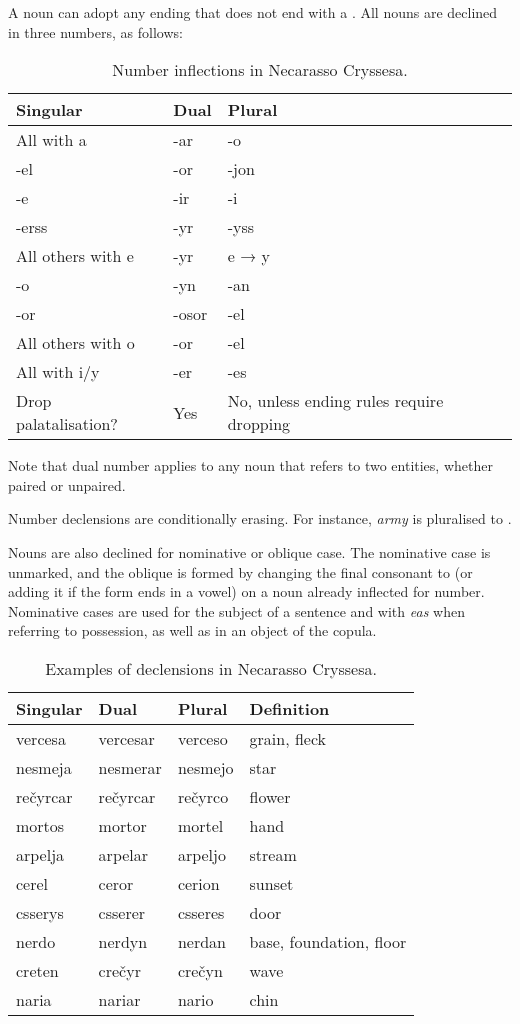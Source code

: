 \documentclass{book}
\begin{document}
A noun can adopt any ending that does not end with a . All nouns are declined in three numbers, as follows:

\begin{table}[h]
  \caption{Number inflections in Necarasso Cryssesa.}
  \centering
  \begin{tabu}{|X|X|X|}
    \hline
    Singular & Dual & Plural \\ \hline
    All with a & -ar & -o \\ \hline
    -el & -or & -jon \\
    -e & -ir & -i \\
    -erss & -yr & -yss \\
    All others with e & -yr & e → y \\ \hline
    -o & -yn & -an \\
    -or & -osor & -el \\
    All others with o & -or & -el \\ \hline
    All with i/y & -er & -es \\ \hline
   Drop palatalisation? & Yes & No, unless ending rules require dropping \\ \hline
  \end{tabu}
\end{table}

Note that dual number applies to any noun that refers to two entities, whether paired or unpaired.

Number declensions are conditionally erasing. For instance,  \emph{army} is pluralised to .

Nouns are also declined for nominative or oblique case. The nominative case is unmarked, and the oblique is formed by changing the final consonant to  (or adding it if the form ends in a vowel) on a noun already inflected for number. Nominative cases are used for the subject of a sentence and with \emph{eas} when referring to possession, as well as in an object of the copula.

\begin{table}[htb]
  \caption{Examples of declensions in Necarasso Cryssesa.}
  \centering
  \begin{tabular}{|l|l|l|l|}
    \hline
    Singular & Dual & Plural & Definition \\ \hline
    vercesa & vercesar & verceso & grain, fleck \\
    nesmeja & nesmerar & nesmejo & star \\
    rečyrcar & rečyrcar & rečyrco & flower \\
    mortos & mortor & mortel & hand \\
    arpelja & arpelar & arpeljo & stream \\
    cerel & ceror & cerion & sunset \\
    csserys & csserer & csseres & door \\
    nerdo & nerdyn & nerdan & base, foundation, floor \\
    creten & crečyr & crečyn & wave \\
    naria & nariar & nario & chin \\ \hline
  \end{tabular}
\end{table}
\end{document}
